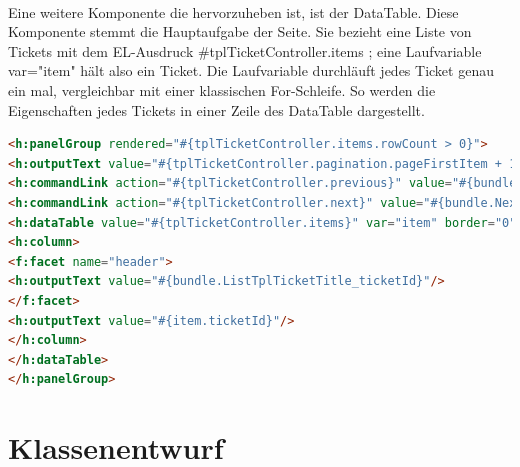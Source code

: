 \paragraph{}
Eine weitere Komponente die hervorzuheben ist, ist der DataTable. Diese Komponente stemmt die Hauptaufgabe der Seite. Sie bezieht eine Liste von Tickets mit dem EL-Ausdruck \glqq \#{tplTicketController.items} \grqq; eine Laufvariable var="item" hält also ein Ticket. Die Laufvariable durchläuft jedes Ticket genau ein mal, vergleichbar mit einer klassischen For-Schleife. So werden die Eigenschaften jedes Tickets in einer Zeile des DataTable dargestellt.

\begin{lstlisting}[language=html, caption=List.xhtml, firstnumber=0, label=Code_Xhtml_Jee]
<h:panelGroup rendered="#{tplTicketController.items.rowCount > 0}">
<h:outputText value="#{tplTicketController.pagination.pageFirstItem + 1}..#{tplTicketController.pagination.pageLastItem + 1}/#{tplTicketController.pagination.itemsCount}"/>&nbsp;
<h:commandLink action="#{tplTicketController.previous}" value="#{bundle.Previous} #{tplTicketController.pagination.pageSize}" rendered="#{tplTicketController.pagination.hasPreviousPage}"/>&nbsp;
<h:commandLink action="#{tplTicketController.next}" value="#{bundle.Next} #{tplTicketController.pagination.pageSize}" rendered="#{tplTicketController.pagination.hasNextPage}"/>&nbsp;
<h:dataTable value="#{tplTicketController.items}" var="item" border="0" cellpadding="2" cellspacing="0" rowClasses="jsfcrud_odd_row,jsfcrud_even_row" rules="all" style="border:solid 1px">
<h:column>
<f:facet name="header">
<h:outputText value="#{bundle.ListTplTicketTitle_ticketId}"/>
</f:facet>
<h:outputText value="#{item.ticketId}"/>
</h:column>
</h:dataTable>
</h:panelGroup>
\end{lstlisting}


\section{Klassenentwurf}

